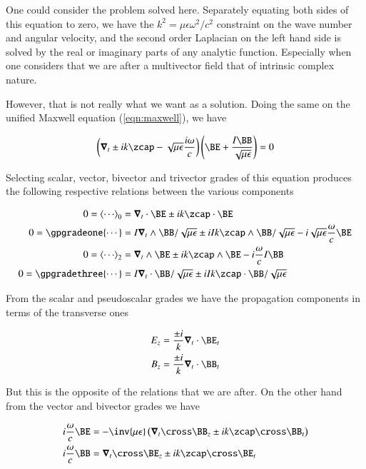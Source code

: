 One could consider the problem solved here.  Separately equating both sides of this equation to zero, we have the $k^2 = \mu\epsilon \omega^2/c^2$ constraint on the wave number and angular velocity, and the second order Laplacian on the left hand side is solved by the real or imaginary parts of any analytic function.  Especially when one considers that we are after a multivector field that of intrinsic complex nature.

However, that is not really what we want as a solution.  Doing the same on the unified Maxwell equation (\ref{eqn:maxwell}), we have

\begin{align}\label{eqn:max2}
\left(\spacegrad_t \pm i k \zcap - \sqrt{\mu\epsilon}\frac{i\omega}{c}\right) \left(\BE + \frac{I\BB}{\sqrt{\mu\epsilon}} \right) = 0
\end{align}

Selecting scalar, vector, bivector and trivector grades of this equation produces the following respective relations between the various components

\begin{align}\label{eqn:blah6}
0 = \gpgradezero{\cdots} &= \spacegrad_t \cdot \BE \pm i k \zcap \cdot \BE \\
0 = \gpgradeone{\cdots} &= I \spacegrad_t \wedge \BB/\sqrt{\mu\epsilon} \pm i I k \zcap \wedge \BB/\sqrt{\mu\epsilon} - i \sqrt{\mu\epsilon}\frac{\omega}{c} \BE \\
0 = \gpgradetwo{\cdots} &= \spacegrad_t \wedge \BE \pm i k \zcap \wedge \BE - i \frac{\omega}{c} I \BB \\
0 = \gpgradethree{\cdots} &= I \spacegrad_t \cdot \BB/\sqrt{\mu\epsilon} \pm i I k \zcap \cdot \BB/\sqrt{\mu\epsilon}
\end{align}

From the scalar and pseudoscalar grades we have the propagation components in terms of the transverse ones

\begin{align}\label{eqn:blah7}
E_z &= \frac{\pm i}{k} \spacegrad_t \cdot \BE_t \\
B_z &= \frac{\pm i}{k} \spacegrad_t \cdot \BB_t 
\end{align}

But this is the opposite of the relations that we are after.  On the other hand from the vector and bivector grades we have

\begin{align}\label{eqn:messy}
i \frac{\omega}{c} \BE &= -\inv{\mu\epsilon}\left(\spacegrad_t \cross \BB_z \pm i k \zcap \cross \BB_t\right) \\
i \frac{\omega}{c} \BB &= \spacegrad_t \cross \BE_z \pm i k \zcap \cross \BE_t
\end{align}

